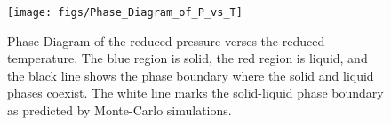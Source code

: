 \documentclass[double,12pt]{beavtex}
\begin{document}
\begin{figure}
  \centering
  \texttt{[image: figs/Phase\_Diagram\_of\_P\_vs\_T]}
  \caption{Phase Diagram of the reduced pressure verses the reduced 
  temperature. The blue region is solid, the red region is liquid,
  and the black line shows the phase boundary where the solid and liquid
  phases coexist. The white line marks the solid-liquid phase boundary  
  as predicted by Monte-Carlo simulations.}
  \label{fig:Phase_Diagram_P_vs_T}
\end{figure}
%
%
%
\begin{figure}
  \centering
  \label{fig:Phase_Diagram_P_vs_T_AS}
\end{figure}
%
%
\begin{figure}
  \centering
  \label{fig:p-vs-T_at_fixed_density}
\end{figure}
\end{document}
